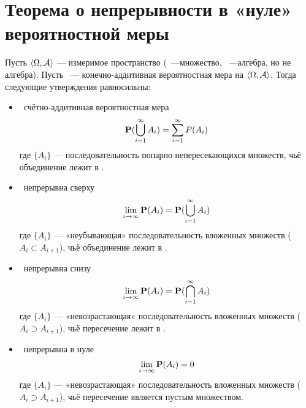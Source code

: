\section{Теорема о непрерывности в «нуле» вероятностной меры}

\begin{theorem}
	Пусть $\langle \Omega, \mathcal{A} \rangle$ --- измеримое пространство (\oO~---множество, \Alg~---алгебра, но не \gm алгебра). Пусть \PP~--- конечно-аддитивная вероятностная мера на $\langle \Omega, \mathcal{A} \rangle$. Тогда следующие утверждения равносильны:
	\begin{itemize}
		\item \PP~счётно-аддитивная вероятностная мера
			$$\mathbf{P} (\bigcup_{i=1}^{\infty}A_i) = \sum_{i=1}^{\infty}P(A_i)$$
			где $\{A_i\}$ --- последовательность попарно непересекающихся множеств, чьё объединение лежит в \Alg.
		\item \PP~непрерывна сверху
			$$\lim_{i\rightarrow\infty}\mathbf{P}(A_i)=\mathbf{P}(\bigcup_{i=1}^\infty A_i)$$
			где $\{A_i\}$ --- «неубывающая» последовательность вложенных множеств ($A_i \subset A_{i+1}$), чьё объединение лежит в \Alg.
		\item \PP~непрерывна снизу
			$$\lim_{i\rightarrow\infty}\mathbf{P}(A_i)=\mathbf{P}(\bigcap_{i=1}^\infty A_i)$$
			где $\{A_i\}$ --- «невозрастающая» последовательность вложенных множеств ($A_i \supset A_{i+1}$), чьё пересечение лежит в \Alg.
		\item \PP~непрерывна в нуле
			$$\lim_{i\rightarrow\infty}\mathbf{P}(A_i)=0$$
			где $\{A_i\}$ --- «невозрастающая» последовательность вложенных множеств ($A_i \supset A_{i+1}$), чьё пересечение является пустым множеством.
	\end{itemize}
\end{theorem}

